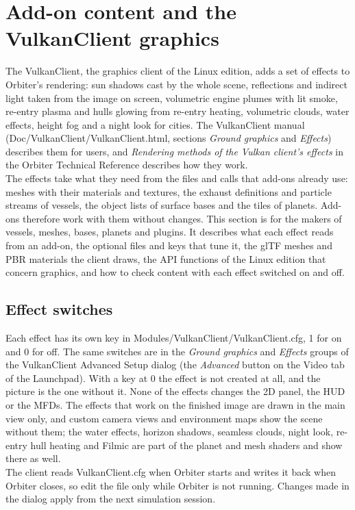 \documentclass[Orbiter Developer Manual.tex]{subfiles}
\begin{document}
\section{Add-on content and the VulkanClient graphics}
\label{sec:vk_content}
\begin{sloppypar}
The VulkanClient, the graphics client of the Linux edition, adds a set of effects to Orbiter's rendering: sun shadows cast by the whole scene, reflections and indirect light taken from the image on screen, volumetric engine plumes with lit smoke, re-entry plasma and hulls glowing from re-entry heating, volumetric clouds, water effects, height fog and a night look for cities. The VulkanClient manual (Doc/VulkanClient/VulkanClient.html, sections \textit{Ground graphics} and \textit{Effects}) describes them for users, and \textit{Rendering methods of the Vulkan client's effects} in the Orbiter Technical Reference describes how they work.\\
The effects take what they need from the files and calls that add-ons already use: meshes with their materials and textures, the exhaust definitions and particle streams of vessels, the object lists of surface bases and the tiles of planets. Add-ons therefore work with them without changes. This section is for the makers of vessels, meshes, bases, planets and plugins. It describes what each effect reads from an add-on, the optional files and keys that tune it, the glTF meshes and PBR materials the client draws, the API functions of the Linux edition that concern graphics, and how to check content with each effect switched on and off.


\subsection{Effect switches}
\label{ssec:vk_switches}
Each effect has its own key in Modules/VulkanClient/VulkanClient.cfg, 1 for on and 0 for off. The same switches are in the \textit{Ground graphics} and \textit{Effects} groups of the VulkanClient Advanced Setup dialog (the \textit{Advanced} button on the Video tab of the Launchpad). With a key at 0 the effect is not created at all, and the picture is the one without it. None of the effects changes the 2D panel, the HUD or the MFDs. The effects that work on the finished image are drawn in the main view only, and custom camera views and environment maps show the scene without them; the water effects, horizon shadows, seamless clouds, night look, re-entry hull heating and Filmic are part of the planet and mesh shaders and show there as well.\\
The client reads VulkanClient.cfg when Orbiter starts and writes it back when Orbiter closes, so edit the file only while Orbiter is not running. Changes made in the dialog apply from the next simulation session.


\end{sloppypar}
\end{document}
